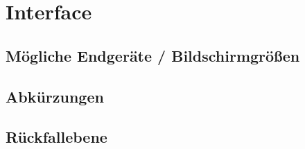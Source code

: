 \section{Interface}

	\subsection{Mögliche Endgeräte / Bildschirmgrößen}
	\subsection{Abkürzungen}
	\subsection{Rückfallebene}
